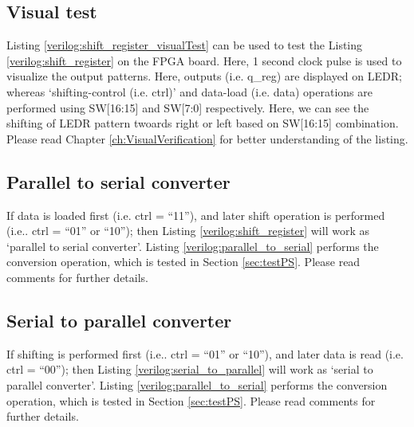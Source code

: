

\subsection{Visual test}

Listing \ref{verilog:shift_register_visualTest} can be used to test the Listing \ref{verilog:shift_register} on the FPGA board. Here, 1 second clock pulse is used to visualize the output patterns. Here, outputs (i.e. q\_reg) are displayed on LEDR; whereas `shifting-control (i.e. ctrl)' and data-load (i.e. data) operations are performed using SW[16:15] and SW[7:0] respectively. Here, we can see the shifting of LEDR pattern twoards right or left based on SW[16:15] combination. Please read Chapter \ref{ch:VisualVerification} for better understanding of the listing.



\subsection{Parallel to serial converter}
If data is loaded first (i.e. ctrl = ``11''), and later shift operation is performed (i.e.. ctrl = ``01'' or ``10''); then Listing \ref{verilog:shift_register} will work as `parallel to serial converter'. Listing \ref{verilog:parallel_to_serial} performs the conversion operation, which is tested in Section \ref{sec:testPS}. Please read comments for further details.




\subsection{Serial to parallel converter}
If shifting is performed first (i.e.. ctrl = ``01'' or ``10''), and later data is read (i.e. ctrl = ``00''); then Listing \ref{verilog:serial_to_parallel} will work as `serial to parallel converter'. Listing \ref{verilog:parallel_to_serial} performs the conversion operation, which is tested in Section \ref{sec:testPS}. Please read comments for further details.

